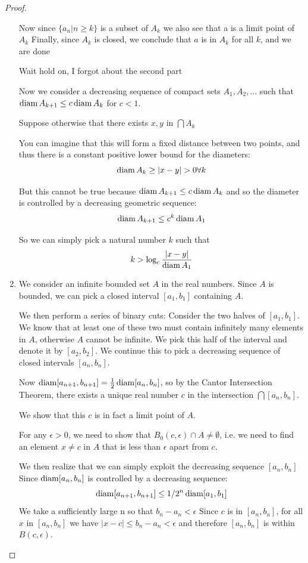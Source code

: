\begin{proof}
\begin{enumerate}[label=(\alph*)]
Now since $\{a_n|n \ge k\}$ is a subset of $A_k$ we also see that a is a limit point of $A_k$
Finally, since $A_k$ is closed, we conclude that $a$ is in $A_k$ for all $k$, and we are done

Wait hold on, I forgot about the second part

Now we consider a decreasing sequence of compact sets $A_1, A_2, \dots$ such that $\operatorname{diam} A_{k+1} \le c \operatorname{diam} A_k$ for $c<1$.

Suppose otherwise that there exists $x, y$ in $\bigcap A_k$

You can imagine that this will form a fixed distance between two points, and thus there is a constant positive lower bound for the diameters:
\[ \operatorname{diam} A_k \ge |x-y| > 0 \forall k \]

But this cannot be true because $\operatorname{diam} A_{k+1} \le c \operatorname{diam} A_k$ and so the diameter is controlled by a decreasing geometric sequence:
\[ \operatorname{diam} A_{k+1} \le c^k \operatorname{diam} A_1 \]

So we can simply pick a natural number $k$ such that
\[ k > \log_c \frac{|x-y|}{\operatorname{diam} A_1} \]

\item We consider an infinite bounded set $A$ in the real numbers. Since $A$ is bounded, we can pick a closed interval $[a_1,b_1]$ containing $A$.

We then perform a series of binary cuts: Consider the two halves of $[a_1,b_1]$. We know that at least one of these two must contain infinitely many elements in $A$, otherwise $A$ cannot be infinite. We pick this half of the interval and denote it by $[a_2,b_2]$. We continue this to pick a decreasing sequence of closed intervals $[a_n,b_n]$.

Now $\operatorname{diam} [a_{n+1},b_{n+1}] = \frac{1}{2} \operatorname{diam} [a_n,b_n]$, so by the Cantor Intersection Theorem, there exists a unique real number $c$ in the intersection $\bigcap[a_n,b_n]$.

We show that this $c$ is in fact a limit point of $A$.

For any $\epsilon>0$, we need to show that $B_0(c,\epsilon) \cap A \neq \emptyset$, i.e. we need to find an element $x \neq c$ in $A$ that is less than $\epsilon$ apart from $c$.

We then realize that we can simply exploit the decreasing sequence $[a_n,b_n]$
Since $\operatorname{diam} [a_n,b_n]$ is controlled by a decreasing sequence:
\[ \operatorname{diam} [a_{n+1},b_{n+1}] \le 1/2^n \operatorname{diam} [a_1,b_1] \]
We take a sufficiently large n so that $b_n-a_n<\epsilon$
Since $c$ is in $[a_n,b_n]$, for all $x$ in $[a_n,b_n]$ we have $|x-c|\le b_n-a_n<\epsilon$ and therefore $[a_n,b_n]$ is within $B(c,\epsilon)$.


\end{enumerate}
\end{proof}
